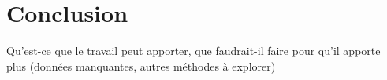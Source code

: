 

\chapter{Conclusion}
Qu'est-ce que le travail peut apporter, que faudrait-il faire pour qu'il apporte plus (données manquantes, autres méthodes à explorer) 


